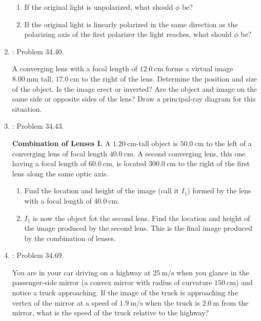 \documentclass[../psets.tex]{subfiles}
\begin{document}
\begin{enumerate}[label={\arabic*)}]
\begin{center}
    \end{center}
    \begin{enumerate}
        \item If the original light is unpolarized, what should $\phi$ be?
        \item If the original light is linearly polarized in the same direction as the polarizing axis of the first polarizer the light reaches, what should $\phi$ be?
    \end{enumerate}
    \item \textcite{bib:YoungFreedman}: Problem 34.40.\par
    A converging lens with a focal length of $\SI{12.0}{\centi\meter}$ forms a virtual image $\SI{8.00}{\milli\meter}$ tall, $\SI{17.0}{\centi\meter}$ to the right of the lens. Determine the position and size of the object. Is the image erect or inverted? Are the object and image on the same side or opposite sides of the lens? Draw a principal-ray diagram for this situation.
    \item \textcite{bib:YoungFreedman}: Problem 34.43.\par
    \textbf{Combination of Lenses I.} A $\SI{1.20}{\centi\meter}$-tall object is $\SI{50.0}{\centi\meter}$ to the left of a converging lens of focal length $\SI{40.0}{\centi\meter}$. A second converging lens, this one having a focal length of $\SI{60.0}{\centi\meter}$, is located $\SI{300.0}{\centi\meter}$ to the right of the first lens along the same optic axis.
    \begin{enumerate}
        \item Find the location and height of the image (call it $I_1$) formed by the lens with a focal length of $\SI{40.0}{\centi\meter}$.
        \item $I_1$ is now the object fot the second lens. Find the location and height of the image produced by the second lens. This is the final image produced by the combination of lenses.
    \end{enumerate}
    \item \textcite{bib:YoungFreedman}: Problem 34.69.\par
    You are in your car driving on a highway at $\SI{25}{\meter\per\second}$ when you glance in the passenger-side mirror (a convex mirror with radius of curvature $\SI{150}{\centi\meter}$) and notice a truck approaching. If the image of the truck is approaching the vertex of the mirror at a speed of $\SI{1.9}{\meter\per\second}$ when the truck is $\SI{2.0}{\meter}$ from the mirror, what is the speed of the truck relative to the highway?

\end{enumerate}
\end{document}
